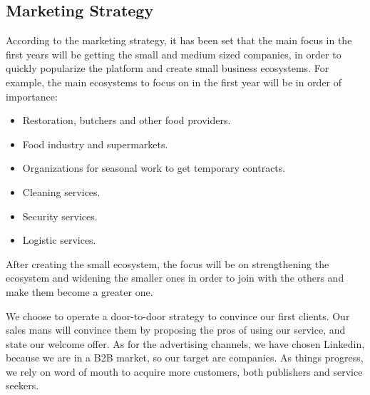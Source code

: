\documentclass[./main.tex]{subfiles}
\begin{document}
\subsection{Marketing Strategy}
According to the marketing strategy, it has been set that the main focus in the first years will be getting the small and medium sized companies, in order to quickly popularize the platform and create small business ecosystems. For example, the main ecosystems to focus on in the first year will be in order of importance:
\begin{itemize}
	\item Restoration, butchers and other food providers.
	\item Food industry and supermarkets.
	\item Organizations for seasonal work to get temporary contracts.
	\item Cleaning services.
	\item Security services.
	\item Logistic services.
\end{itemize}
After creating the small ecosystem, the focus will be on strengthening the ecosystem and widening the smaller ones in order to join with the others and make them become a greater one.

We choose to operate a door-to-door strategy to convince our first clients. Our sales mans will convince them by proposing the pros of using our service, and state our welcome offer.
As for the advertising channels, we have chosen Linkedin, because we are in a B2B market, so our target are companies. 
As things progress, we rely on word of mouth to acquire more customers, both publishers and service seekers.
\end{document}
